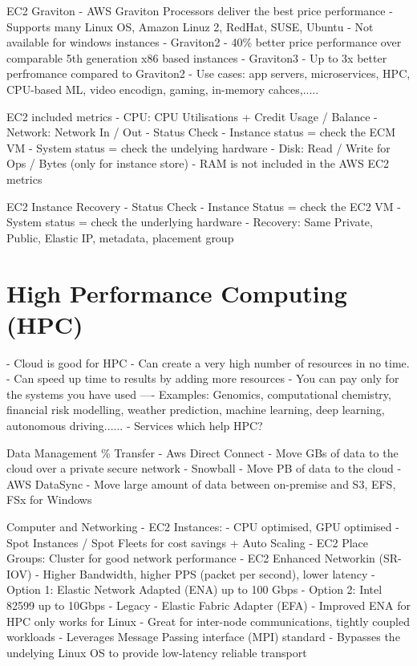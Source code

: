 \documentclass[11pt]{book}
\begin{document}
    EC2 Graviton
    - AWS Graviton Processors deliver the best price performance
    - Supports many Linux OS, Amazon Linuz 2, RedHat, SUSE, Ubuntu
    - Not available for windows instances
    - Graviton2 - 40\% better price performance over comparable 5th generation x86 based instances
    - Graviton3 - Up to 3x better perfromance compared to Graviton2
    - Use cases: app servers, microservices, HPC, CPU-based ML, video encodign, gaming, in-memory cahces,.....

    EC2 included metrics
    - CPU: CPU Utilisations + Credit Usage / Balance
    - Network: Network In / Out
    - Status Check
        - Instance status = check the ECM VM
        - System status = check the undelying hardware
    - Disk: Read  / Write for Ops / Bytes (only for instance store)
    - RAM is not included in the AWS EC2 metrics

    EC2 Instance Recovery
    - Status Check
        - Instance Status = check the EC2 VM
        - System status = check the underlying hardware
    - Recovery: Same Private, Public, Elastic IP, metadata, placement group

    \section{High Performance Computing (HPC)}
    - Cloud is good for HPC
    - Can create a very high number of resources in no time.
    - Can speed up time to results by adding more resources
    - You can pay only for the systems you have used
    ---- Examples: Genomics, computational chemistry, financial risk modelling, weather prediction, machine learning, deep learning, autonomous driving......
    - Services which help HPC?

    Data Management \% Transfer
    - Aws Direct Connect
        - Move GBs of data to the cloud over a private secure network
    - Snowball
        - Move PB of data to the cloud
    - AWS DataSync
        - Move large amount of data between on-premise and S3, EFS, FSx for Windows

    Computer and Networking
    - EC2 Instances:
        - CPU optimised, GPU optimised
        - Spot Instances / Spot Fleets for cost savings + Auto Scaling
    - EC2 Place Groups: Cluster for good network performance
    - EC2 Enhanced Networkin (SR-IOV)
        - Higher Bandwidth, higher PPS (packet per second), lower latency
        - Option 1: Elastic Network Adapted (ENA) up to 100 Gbps
        - Option 2: Intel 82599 up to 10Gbps - Legacy
    - Elastic Fabric Adapter (EFA)
        - Improved ENA for HPC only works for Linux
        - Great for inter-node communications, tightly coupled workloads
        - Leverages Message Passing interface (MPI) standard
        - Bypasses the undelying Linux OS to provide low-latency reliable transport
\end{document}
